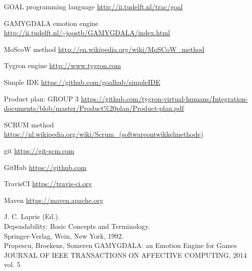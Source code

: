 \documentclass[11pt]{article}
\begin{document}
\clearpage

\printglossaries

\clearpage

\begin{thebibliography}{9}
	
	GOAL programming language
	\url{http://ii.tudelft.nl/trac/goal}
	
	GAMYGDALA emotion engine
	\url{http://ii.tudelft.nl/~joostb/GAMYGDALA/index.html}
	
	MoScoW method
	\url{http://en.wikipedia.org/wiki/MoSCoW_method }
	
	Tygron engine
	\url{http://www.tygron.com }
	
	Simple IDE
	\url{https://github.com/goalhub/simpleIDE }
	
	Product plan: GROUP 3
	\url{https://github.com/tygron-virtual-humans/Integration-documents/blob/master/Product\%20plan/Product-plan.pdf}
	
	SCRUM method
	\url{https://nl.wikipedia.org/wiki/Scrum_(softwareontwikkelmethode)}
	
	git
	\url{https://git-scm.com }
	
	GitHub
	\url{https://github.com }
	
	TravisCI
	\url{https://travis-ci.org }
	
	Maven
	\url{https://maven.apache.org }
	
	J. C. Laprie (Ed.).\\ 
	Dependability: Basic Concepts and Terminology. \\
	Springer-Verlag, Wein, New York, 1992.\\

	Propescu, Broekens, Someren
	GAMYGDALA: an Emotion Engine for Games
	JOURNAL OF IEEE TRANSACTIONS ON AFFECTIVE COMPUTING, 2014 vol. 5
	
	
\end{thebibliography}
\end{document}
